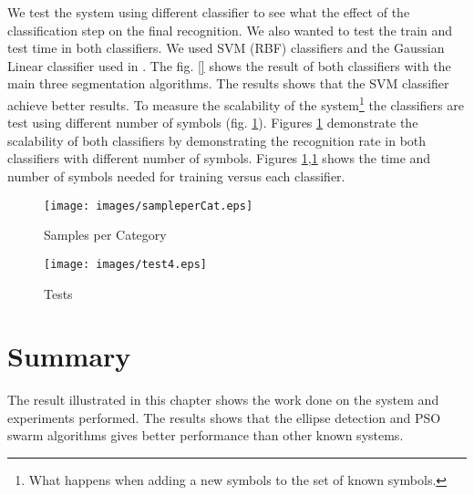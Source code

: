 We test the system using different classifier to see what the effect of the classification step on the final recognition. We also wanted to test the train and test time in both classifiers. We used SVM (RBF) classifiers and the Gaussian Linear classifier used in \cite{}. The fig. \ref{} shows the result of both classifiers with the main three segmentation algorithms. The results shows that the SVM classifier achieve better results. To measure the scalability of the system\footnote{What happens when adding a new symbols to the set of known symbols.} the classifiers are test using different number of symbols (fig. \ref{fig:sampleperCat}). Figures \ref{fig:sampleperCat} demonstrate the scalability of both classifiers by demonstrating the recognition rate in both classifiers with different number of symbols. Figures \ref{fig:sampleperCat},\ref{fig:sampleperCat} shows the time and number of symbols needed for training versus each classifier. 

\begin{figure}
	\centering
		\texttt{[image: images/sampleperCat.eps]}
	\caption{Samples per Category }
	\label{fig:sampleperCat}
\end{figure}

\begin{figure}
	\centering
		\texttt{[image: images/test4.eps]}
	\caption{Tests}
	\label{fig:test4}
\end{figure}

\section{Summary}
\label{sec:ResultSummary}

The result illustrated in this chapter shows the work done on the system and experiments performed. The results shows that the ellipse detection and PSO swarm algorithms gives better performance than other known systems. 


